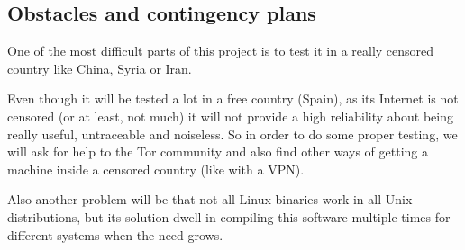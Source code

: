 \subsection{Obstacles and contingency plans}
\label{ssec:obstacles}
One of the most difficult parts of this project is to test it in a really censored country like China, Syria or Iran. 

Even though it will be tested a lot in a free country (Spain), as its Internet is not censored (or at least, not much) it will not provide a high reliability about being really useful, untraceable and noiseless. So in order to do some proper testing, we will ask for help to the Tor community and also find other ways of getting a machine inside a censored country (like with a VPN).  

Also another problem will be that not all Linux binaries work in all Unix distributions, but its solution dwell in compiling this software multiple times for different systems when the need grows.